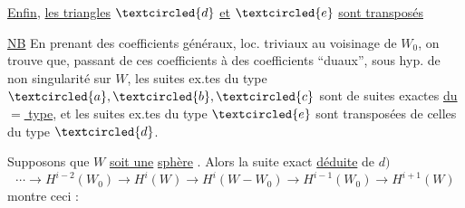 \uline{Enfin}, \uline{les triangles} $\textcircled{d}$ \uline{et} $\textcircled{e}$ \uline{sont transposés}

\uline{NB} En prenant des coefficients généraux, loc. triviaux au voisinage de \deleted{\unsure{\(\partial\)}} $W_0$, on trouve que, passant de ces coefficients à des coefficients ``duaux'',  sous hyp. de  non singularité sur $W$, les suites ex.tes du type $\textcircled{a},\textcircled{b},\textcircled{c}$ sont  de suites exactes \uline{du $=$ type}, et les suites ex.tes du type $\textcircled{e}$ sont transposées de celles du type $\textcircled{d}$.

Supposons que $W$ \uline{soit une} \uline{sphère} . Alors la suite exact  \uline{déduite} de $d)$
\[\cdots\longrightarrow H^{i-2}(W_0)\longrightarrow H^i(W)\longrightarrow H^i(W-W_0)\longrightarrow H^{i-1}(W_0)\longrightarrow H^{i+1}(W)\]
montre ceci :

